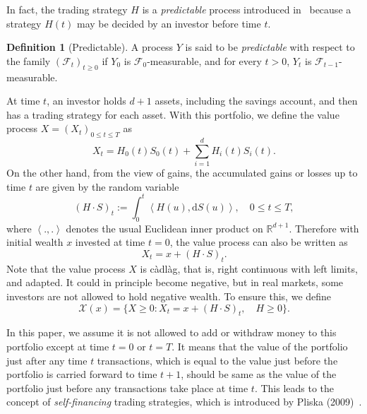 \documentclass[a4paper]{article}
\theoremstyle{definition}
\newtheorem{definition}[theorem]{Definition}
\numberwithin{equation}{section}
\begin{document}
In fact, the trading strategy $H$ is a \emph{predictable} process introduced in~\cite{def_adapted,def_predictable} because a strategy $H(t)$ may be decided by an investor before time $t$.
\begin{definition}[Predictable]
A process $Y$ is said to be \emph{predictable} with respect to the family $(\mathcal F_t)_{t\geq0}$ if $Y_0$ is $\mathcal F_0$-measurable, and for every $t>0$, $Y_t$ is $\mathcal F_{t-1}$-measurable.
\end{definition}

At time $t$, an investor holds $d+1$ assets, including the savings account, and then has a trading strategy for each asset. With this portfolio, we define the value process $X=(X_t)_{0\leq t\leq T}$ as
\begin{equation}\label{value process}
X_t=H_0(t)S_0(t)+\sum^d_{i=1}H_i(t)S_i(t).
\end{equation}
On the other hand, from the view of gains, the accumulated gains or losses up to time $t$ are given by the random variable
$$(H\cdot S)_t:=\int^t_0\left<H(u),\mathrm dS(u)\right>,\quad0\leq t\leq T,$$
where $\left<.,.\right>$ denotes the usual Euclidean inner product on $\mathbb R^{d+1}$. Therefore with initial wealth $x$ invested at time $t=0$, the value process can also be written as
\begin{equation}\label{prob:X_t}
X_t=x+(H\cdot S)_t.
\end{equation}
Note that the value process $X$ is c\`adl\`ag, that is, right continuous with left limits, and adapted. It could in principle become negative, but in real markets, some investors are not allowed to hold negative wealth. To ensure this, we define 
$$\mathcal X(x)=\{X\geq0:X_t=x+(H\cdot S)_t,\quad H\geq0\}.$$

In this paper, we assume it is not allowed to add or withdraw money to this portfolio except at time $t=0$ or $t=T$. It means that the value of the portfolio just after any time $t$ transactions, which is equal to the value just before the portfolio is carried forward to time $t+1$, should be same as the value of the portfolio just before any transactions take place at time $t$. This leads to the concept of \emph{self-financing} trading strategies, which is introduced by Pliska (2009)~\cite{book2}.
\end{document}
